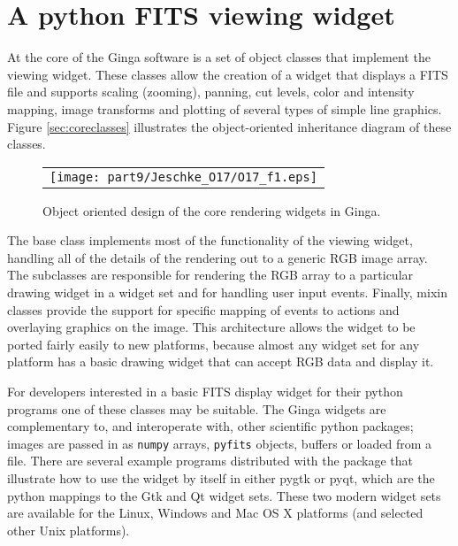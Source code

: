 \section{A python FITS viewing widget}
At the core of the Ginga software is a set of object classes that
implement the viewing widget.  These classes allow the creation of
a widget that displays a FITS file and supports scaling (zooming),
panning, cut levels, color and intensity mapping, image transforms and
plotting of several types of simple line graphics.   
Figure \ref{sec:coreclasses} illustrates the object-oriented inheritance
diagram of these classes.
\label{sec:coreclasses}
\begin{figure}
  \begin{center}
    \begin{tabular}{c}
      \texttt{[image: part9/Jeschke\_O17/O17\_f1.eps]}
    \end{tabular}
  \end{center}
  \caption[example] 
          { \label{fig:onion} 
            Object oriented design of the core rendering widgets in Ginga.} 
\end{figure} 
The base class implements most of the functionality of the viewing
widget, handling all of the details of the rendering out to a generic
RGB image array.
The subclasses are responsible for rendering the RGB array to a
particular drawing widget in a widget set and for handling user input
events. 
Finally, mixin classes \citep{mixins}
provide the support for specific mapping of events to actions and
overlaying graphics on the image.
This architecture allows the widget to be ported fairly easily to new
platforms, because almost any widget set for any platform has a basic
drawing widget that can accept RGB data and display it.

For developers interested in a basic FITS display widget for their
python programs one of these classes may be suitable.
The Ginga widgets are complementary to, and interoperate with, other
scientific python packages; images are passed in as {\tt numpy} arrays,
{\tt pyfits} objects, buffers or loaded from a file.  
There are several 
example programs distributed with the package that illustrate how
to use the widget by itself in either pygtk or pyqt, which are the
python mappings to the Gtk and Qt widget sets. 
These two modern widget sets are available for the Linux, Windows and
Mac OS X platforms (and selected other Unix platforms).

